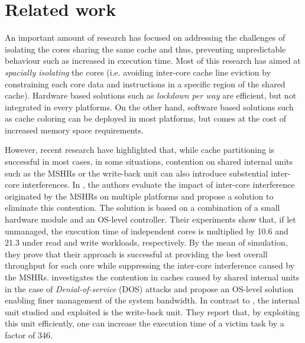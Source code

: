 \section{Related work}
    An important amount of research has focused on addressing the challenges of isolating the cores sharing the same cache and thus, preventing unpredictable behaviour such as increased in execution time.
    Most of this research \cite{Mancuso2013RealtimeCM, 6755286} has aimed at \emph{spacially isolating} the cores (i.e. avoiding inter-core cache line eviction by constraining each core data and instructions in a specific region of the shared cache). Hardware based solutions such as \emph{lockdown per way} \cite{Giovani_cahe_partitioning_survey} are efficient, but not integrated in every platforms.
    On the other hand, software based solutions such as cache coloring \cite{Mancuso2013RealtimeCM} can be deployed in most platforms, but comes at the cost of increased memory space requirements.

    However, recent research \cite{Valsan2017AddressingIC, Heechul_DDOS_attacks_on_shared_cache} have highlighted that, while cache partitioning is successful in most cases, in some situations, contention on shared internal units such as the MSHRs or the write-back unit can also introduce substential inter-core interferences.
    In \cite{Valsan2017AddressingIC}, the authors evaluate the impact of inter-core interference originated by the MSHRs on multiple platforms and propose a solution to eliminate this contention. The solution is based on a combination of a small hardware module and an OS-level controller.
    Their experiments show that, if let unmanaged, the execution time of independent cores is multiplied by 10.6 and 21.3 under read and write workloads, respectively.
    By the mean of simulation, they prove that their approach is successful at providing the best overall throughput for each core while suppressing the inter-core interference caused by the MSHRs.
    \cite{Heechul_DDOS_attacks_on_shared_cache} investigates the contention in caches caused by shared internal units in the case of \emph{Denial-of-service} (DOS) attacks and propose an OS-level solution enabling finer management of the system bandwidth.
    In contrast to \cite{Valsan2017AddressingIC}, the internal unit studied and exploited is the write-back unit.
    They report that, by exploiting this unit efficiently, one can increase the execution time of a victim task by a factor of 346.
